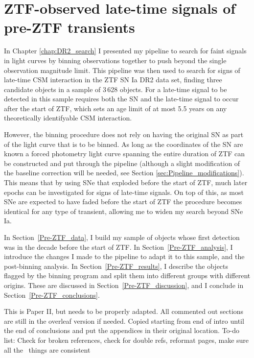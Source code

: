 \documentclass[a4paper,oneside,12pt, class=Latex/Classes/PhDthesisPSnPDF, crop=false]{standalone}
\begin{document}
\doublespacing
\chapter{ZTF-observed late-time signals of pre-ZTF transients}
\label{chap:pre-ZTF_search}


In Chapter \ref{chap:DR2_search} I presented my pipeline to search for faint signals in light curves by binning observations together to push beyond the single observation magnitude limit. This pipeline was then used to search for signs of late-time CSM interaction in the ZTF SN Ia DR2 data set, finding three candidate objects in a sample of 3\,628 objects. For a late-time signal to be detected in this sample requires both the SN and the late-time signal to occur after the start of ZTF, which sets an age limit of at most 5.5 years on any theoretically identifyable CSM interaction.

However, the binning procedure does not rely on having the original SN as part of the light curve that is to be binned. As long as the coordinates of the SN are known a forced photometry light curve spanning the entire duration of ZTF can be constructed and put through the pipeline (although a slight modification of the baseline correction will be needed, see Section \ref{sec:Pipeline_modifications}). This means that by using SNe that exploded before the start of ZTF, much later epochs can be investigated for signs of late-time signals. On top of this, as most SNe are expected to have faded before the start of ZTF the procedure becomes identical for any type of transient, allowing me to widen my search beyond SNe Ia.

In Section~\ref{Pre-ZTF_data}, I build my sample of objects whose first detection was in the decade before the start of ZTF. In Section~\ref{Pre-ZTF_analysis}, I introduce the changes I made to the pipeline to adapt it to this sample, and the post-binning analysis. In Section~\ref{Pre-ZTF_results}, I describe the objects flagged by the binning program and split them into different groups with different origins. These are discussed in Section~\ref{Pre-ZTF_discussion}, and I conclude in Section~\ref{Pre-ZTF_conclusions}.

\color{red} This is Paper II, but needs to be properly adapted. All commented out sections are still in the overleaf version if needed. Copied starting from end of intro until the end of conclusions and put the appendices in their original location. To-do list: Check for broken references, check for double refs, reformat pages, make sure all the \ztfg\ztfr\ztfi\ things are consistent\color{black}
\end{document}
